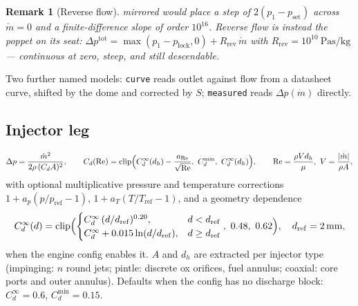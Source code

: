 \documentclass[11pt,a4paper]{article}
\newtheorem{remark}{Remark}
\newcommand{\mdot}{\dot{m}}
\newcommand{\code}[1]{\texttt{#1}}
\begin{document}
\begin{remark}[Reverse flow]
 mirrored would place a step of $2(p_1-p_{\mathrm{set}})$ across
$\mdot=0$ and a finite-difference slope of order $10^{16}$. Reverse flow is
instead the poppet on its seat: $\Delta p^{\mathrm{tot}} = \max(p_1-p_{\mathrm{lock}},0) + R_{\mathrm{rev}}\,\mdot$
with $R_{\mathrm{rev}}=10^{10}\ \si{\pascal\second\per\kilogram}$ --- continuous
at zero, steep, and still descendable.
\end{remark}

Two further named models: \code{curve} reads outlet against flow from a
datasheet curve, shifted by the dome and corrected by $S$; \code{measured}
reads $\Delta p(\mdot)$ directly.

\subsection{Injector leg}\label{sec:injectorleg}
\begin{equation}
  \Delta p = \frac{\mdot^2}{2\rho\,(C_d A)^2},\qquad
  C_d(\mathrm{Re}) = \mathrm{clip}\Bigl(C_d^{\infty}(d_h) - \frac{a_{\mathrm{Re}}}{\sqrt{\mathrm{Re}}},\ C_d^{\min},\ C_d^{\infty}(d_h)\Bigr),\qquad
  \mathrm{Re}=\frac{\rho V d_h}{\mu},\ V=\frac{|\mdot|}{\rho A},
  \label{eq:cd}
\end{equation}
with optional multiplicative pressure and temperature corrections
$1+a_p(p/p_{\mathrm{ref}}-1)$, $1+a_T(T/T_{\mathrm{ref}}-1)$, and a geometry
dependence
\begin{equation}
  C_d^{\infty}(d) = \mathrm{clip}\Bigl(
    \begin{cases} C_d^{\infty}\,(d/d_{\mathrm{ref}})^{0.20}, & d<d_{\mathrm{ref}}\\ C_d^{\infty} + 0.015\ln(d/d_{\mathrm{ref}}), & d\ge d_{\mathrm{ref}}\end{cases},\ 0.48,\ 0.62\Bigr),
  \quad d_{\mathrm{ref}}=\SI{2}{\milli\metre},
\end{equation}
when the engine config enables it. $A$ and $d_h$ are extracted per injector
type (impinging: $n$ round jets; pintle: discrete ox orifices, fuel annulus;
coaxial: core ports and outer annulus). Defaults when the config has no
discharge block: $C_d^\infty=0.6$, $C_d^{\min}=0.15$.

\end{document}

